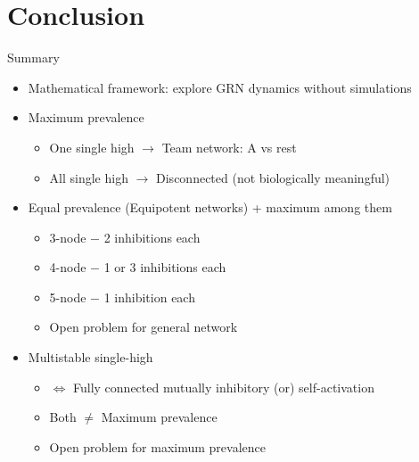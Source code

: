 \documentclass[aspectratio=169,9pt]{beamer}
\theoremstyle{definition}
\theoremstyle{remark}
\begin{document}
\section{Conclusion}
\begin{frame}{Summary}
    \begin{itemize}
        \item Mathematical framework: explore GRN dynamics without simulations
        \pause 
        \item Maximum prevalence
            \begin{itemize}
                \item One single high $\rightarrow$ Team network: A vs rest 
                \item All single high $\rightarrow$ Disconnected (not biologically meaningful)
            \end{itemize}
        \pause 
        \item Equal prevalence (Equipotent networks) + maximum among them
            \begin{itemize}
                \item 3-node $-$ 2 inhibitions each
                \item 4-node $-$ 1 or 3 inhibitions each
                \item 5-node $-$ 1 inhibition each
                \item Open problem for general network
            \end{itemize}
        \pause
        \item Multistable single-high 
            \begin{itemize}
                \item $\iff$ Fully connected mutually inhibitory (or) self-activation
                \item Both $\not =$ Maximum prevalence
                \item Open problem for maximum prevalence
            \end{itemize}
    \end{itemize}
\end{frame}

\appendix
\end{document}
